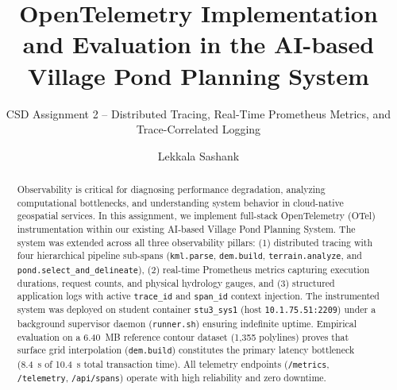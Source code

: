 \documentclass[manuscript,screen]{acmart}
\begin{document}
\title{OpenTelemetry Implementation and Evaluation in the AI-based Village Pond Planning System}
\subtitle{CSD Assignment 2 -- Distributed Tracing, Real-Time Prometheus Metrics, and Trace-Correlated Logging}

\author{Lekkala Sashank}

\renewcommand{\shortauthors}{Lekkala Sashank}

\begin{abstract}
Observability is critical for diagnosing performance degradation, analyzing computational bottlenecks, and understanding system behavior in cloud-native geospatial services. In this assignment, we implement full-stack OpenTelemetry (OTel) instrumentation within our existing AI-based Village Pond Planning System. The system was extended across all three observability pillars: (1) distributed tracing with four hierarchical pipeline sub-spans (\texttt{kml.parse}, \texttt{dem.build}, \texttt{terrain.analyze}, and \texttt{pond.select\_and\_delineate}), (2) real-time Prometheus metrics capturing execution durations, request counts, and physical hydrology gauges, and (3) structured application logs with active \texttt{trace\_id} and \texttt{span\_id} context injection. The instrumented system was deployed on student container \texttt{stu3\_sys1} (host \texttt{10.1.75.51:2209}) under a background supervisor daemon (\texttt{runner.sh}) ensuring indefinite uptime. Empirical evaluation on a 6.40~MB reference contour dataset (1,355 polylines) proves that surface grid interpolation (\texttt{dem.build}) constitutes the primary latency bottleneck (8.4~s of 10.4~s total transaction time). All telemetry endpoints (\texttt{/metrics}, \texttt{/telemetry}, \texttt{/api/spans}) operate with high reliability and zero downtime.
\end{abstract}


\maketitle

\end{document}
